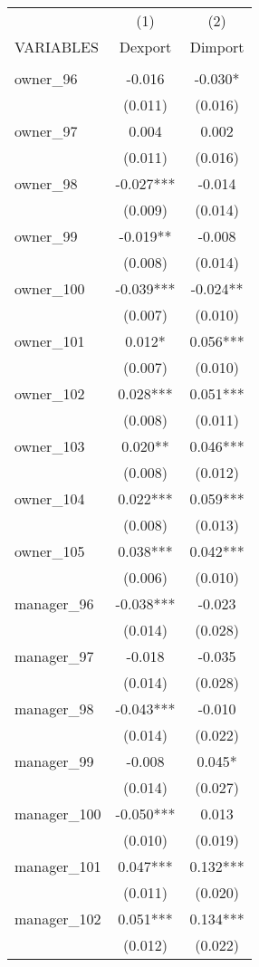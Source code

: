 \begin{tabular}{lcc} \hline
 & (1) & (2) \\
VARIABLES & Dexport & Dimport \\ \hline
 &  &  \\
owner\_96 & -0.016 & -0.030* \\
 & (0.011) & (0.016) \\
owner\_97 & 0.004 & 0.002 \\
 & (0.011) & (0.016) \\
owner\_98 & -0.027*** & -0.014 \\
 & (0.009) & (0.014) \\
owner\_99 & -0.019** & -0.008 \\
 & (0.008) & (0.014) \\
owner\_100 & -0.039*** & -0.024** \\
 & (0.007) & (0.010) \\
owner\_101 & 0.012* & 0.056*** \\
 & (0.007) & (0.010) \\
owner\_102 & 0.028*** & 0.051*** \\
 & (0.008) & (0.011) \\
owner\_103 & 0.020** & 0.046*** \\
 & (0.008) & (0.012) \\
owner\_104 & 0.022*** & 0.059*** \\
 & (0.008) & (0.013) \\
owner\_105 & 0.038*** & 0.042*** \\
 & (0.006) & (0.010) \\
manager\_96 & -0.038*** & -0.023 \\
 & (0.014) & (0.028) \\
manager\_97 & -0.018 & -0.035 \\
 & (0.014) & (0.028) \\
manager\_98 & -0.043*** & -0.010 \\
 & (0.014) & (0.022) \\
manager\_99 & -0.008 & 0.045* \\
 & (0.014) & (0.027) \\
manager\_100 & -0.050*** & 0.013 \\
 & (0.010) & (0.019) \\
manager\_101 & 0.047*** & 0.132*** \\
 & (0.011) & (0.020) \\
manager\_102 & 0.051*** & 0.134*** \\
 & (0.012) & (0.022) \\

\end{tabular}
